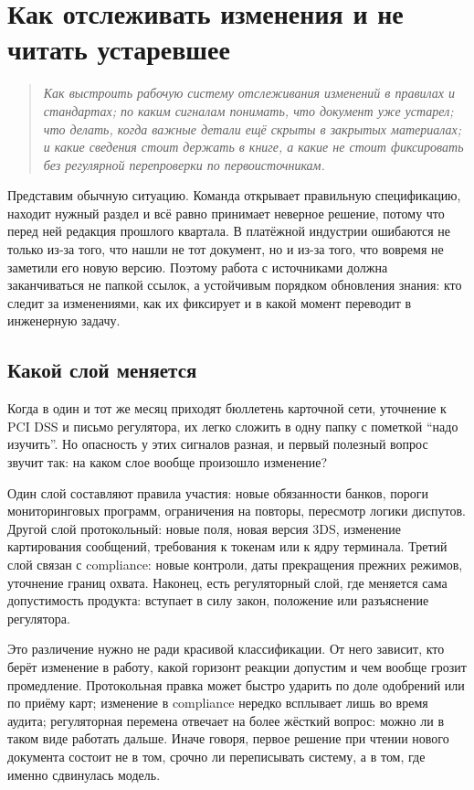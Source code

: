 \chapter{Как отслеживать изменения и не читать устаревшее}
\label{ch:change-tracking}
\begin{quote}
  \itshape
  Как выстроить рабочую систему отслеживания изменений в правилах
  и стандартах; по каким сигналам понимать, что документ уже устарел;
  что делать, когда важные детали ещё скрыты в закрытых материалах;
  и какие сведения стоит держать в книге, а какие не стоит
  фиксировать без регулярной перепроверки по первоисточникам.
\end{quote}

Представим обычную ситуацию. Команда открывает правильную
спецификацию, находит нужный раздел и всё равно принимает неверное
решение, потому что перед ней редакция прошлого квартала.
В платёжной индустрии ошибаются не только из-за того, что нашли
не тот документ, но и из-за того, что вовремя не заметили
его новую версию. Поэтому работа с источниками должна
заканчиваться не папкой ссылок, а устойчивым порядком обновления
знания: кто следит за изменениями, как их фиксирует и в какой
момент переводит в инженерную задачу.

\section{Какой слой меняется}
\label{sec:ps-tracking-layers}

Когда в один и тот же месяц приходят бюллетень карточной сети,
уточнение к PCI DSS и письмо регулятора, их легко сложить в одну
папку с пометкой \enquote{надо изучить}. Но опасность у этих сигналов
разная, и первый полезный вопрос звучит так: на каком слое вообще
произошло изменение?

Один слой составляют правила участия: новые обязанности банков,
пороги мониторинговых программ, ограничения на повторы, пересмотр
логики диспутов. Другой слой протокольный: новые поля, новая
версия 3DS, изменение картирования сообщений, требования
к токенам или к ядру терминала. Третий слой связан с compliance:
новые контроли, даты прекращения прежних режимов, уточнение границ
охвата. Наконец, есть регуляторный слой, где меняется сама
допустимость продукта: вступает в силу закон, положение
или разъяснение регулятора.

Это различение нужно не ради красивой классификации. От него
зависит, кто берёт изменение в работу, какой горизонт реакции
допустим и чем вообще грозит промедление. Протокольная правка
может быстро ударить по доле одобрений или по приёму карт;
изменение в compliance нередко всплывает лишь во время аудита;
регуляторная перемена отвечает на более жёсткий вопрос:
можно ли в таком виде работать дальше. Иначе говоря, первое
решение при чтении нового документа состоит не в том, срочно ли
переписывать систему, а в том, где именно сдвинулась модель.

